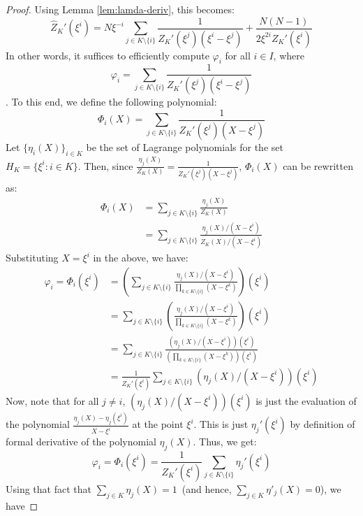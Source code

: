 \begin{proof}
    Using Lemma \ref{lem:lamda-deriv}, this becomes:
    $$ \widehat{Z}_K'(\xi^i)= N\xi^{-i}\sum_{j\in K\setminus \{i\}}\frac{1}{Z_K'(\xi^j)(\xi^i-\xi^j)} + \frac{N(N-1)}{2\xi^{2i}Z_K'(\xi^i)}$$
    In other words, it suffices to efficiently compute $\varphi_i$ for all $i \in I$, where
   	$$\varphi_i=\sum_{j\in K\setminus \{i\}}\frac{1}{Z_K'(\xi^j)(\xi^i-\xi^j)}$$. To this end, we define the following polynomial:
    $$ \Phi_i(X) = \sum_{j\in K\setminus \{i\}} \frac{1}{Z_K'(\xi^j)(X-\xi^j)} $$
    Let $\{\eta_i(X)\}_{i\in K}$ be the set of Lagrange polynomials for the set $H_K = \{\xi^i:i\in K\}$.
    Then, since $\frac{\eta_j(X)}{Z_K(X)}=\frac{1}{Z_K'(\xi^j)(X-\xi^j)}$, $\Phi_i(X)$ can be rewritten as:
    \begin{align*}
        \Phi_i(X)&=\sum_{j\in K\setminus \{i\}} \frac{\eta_j(X)}{Z_K(X)}\\
        &= \sum_{j\in K\setminus \{i\}} \frac{\eta_j(X)/(X-\xi^i)}{Z_K(X)/(X-\xi^i)}
    \end{align*}
    Substituting $X=\xi^i$ in the above, we have:
    \begin{align*}\varphi_i = \Phi_i(\xi^i) &= \left(\sum_{j\in K\setminus \{i\}}\frac{\eta_j(X)/(X-\xi^i)}{\prod_{k \in K \setminus \{i\}}(X-\xi^k)}\right)(\xi^i)\\
    &= \sum_{j\in K\setminus \{i\}}\left(\frac{\eta_j(X)/(X-\xi^i)}{\prod_{k \in K \setminus \{i\}}(X-\xi^k)}\right)(\xi^i)\\
    &= \sum_{j\in K\setminus \{i\}}\frac{\left(\eta_j(X)/(X-\xi^i)\right)(\xi^i)}{\left(\prod_{k \in K \setminus \{i\}}(X-\xi^k)\right)(\xi^i)}\\
    &= \frac{1}{Z_K'(\xi^i)}\sum_{j\in K\setminus \{i\}}\left(\eta_j(X)/(X-\xi^i)\right)(\xi^i)
    \end{align*}
	Now, note that for all $j \neq i$, $\left(\eta_j(X)/(X-\xi^i)\right)(\xi^i)$ is just the evaluation of the polynomial $\frac{\eta_j(X)-\eta_j(\xi^i)}{X-\xi^i}$ at the point $\xi^i$. 
	This is just $\eta_j'(\xi^i)$ by definition of formal derivative of the polynomial $\eta_j(X)$. Thus, we get:
    $$\varphi_i =\Phi_i(\xi^i) =  \frac{1}{Z_K'(\xi^i)}\sum_{j\in K\setminus \{i\}}\eta_j'(\xi^i)$$
   Using that fact that $\sum_{j\in K}\eta_j(X) = 1$~(and hence,  $\sum_{j\in K}\eta'_j(X) = 0$), we have

\end{proof}
